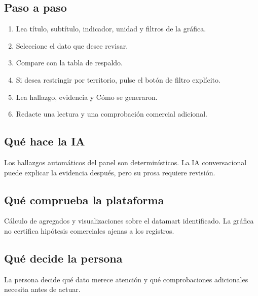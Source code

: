 \subsection{Paso a paso}
\begin{enumerate}
\item Lea título, subtítulo, indicador, unidad y filtros de la gráfica.\par\nopagebreak[4]
\item Seleccione el dato que desee revisar.\par\nopagebreak[4]
\item Compare con la tabla de respaldo.\par\nopagebreak[4]
\item Si desea restringir por territorio, pulse el botón de filtro explícito.\par\nopagebreak[4]
\item Lea hallazgo, evidencia y Cómo se generaron.\par\nopagebreak[4]
\item Redacte una lectura y una comprobación comercial adicional.\par\nopagebreak[4]
\end{enumerate}
\subsection{Qué hace la IA}
Los hallazgos automáticos del panel son determinísticos. La IA conversacional puede explicar la evidencia después, pero su prosa requiere revisión.

\subsection{Qué comprueba la plataforma}
Cálculo de agregados y visualizaciones sobre el datamart identificado. La gráfica no certifica hipótesis comerciales ajenas a los registros.

\subsection{Qué decide la persona}
La persona decide qué dato merece atención y qué comprobaciones adicionales necesita antes de actuar.

